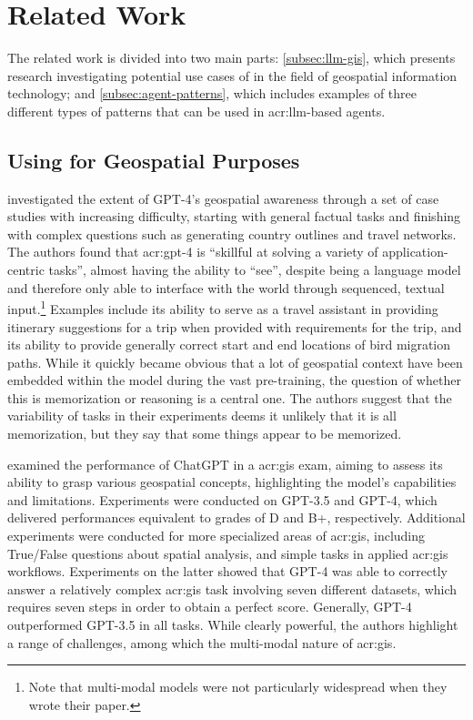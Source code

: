 \section{Related Work}
\label{sec:related-work}

The related work is divided into two main parts: \autoref{subsec:llm-gis}, which presents research investigating potential use cases of  in the field of geospatial information technology; and \autoref{subsec:agent-patterns}, which includes examples of three different types of patterns that can be used in \acrshort{acr:llm}-based agents.

\subsection[Using LLMs for Geospatial Purposes]{Using  for Geospatial Purposes}
\label{subsec:llm-gis}

\cite{robertsGPT4GEOHowLanguage2023} investigated the extent of GPT-4's geospatial awareness through a set of case studies with increasing difficulty, starting with general factual tasks and finishing with complex questions such as generating country outlines and travel networks. The authors found that \acrshort{acr:gpt}-4 is \enquote{skillful at solving a variety of application-centric tasks}, almost having the ability to \enquote{see}, despite being a language model and therefore only able to interface with the world through sequenced, textual input.\footnote{Note that multi-modal models were not particularly widespread when they wrote their paper.} Examples include its ability to serve as a travel assistant in providing itinerary suggestions for a trip when provided with requirements for the trip, and its ability to provide generally correct start and end locations of bird migration paths. While it quickly became obvious that a lot of geospatial context have been embedded within the model during the vast pre-training, the question of whether this is memorization or reasoning is a central one. The authors suggest that the variability of tasks in their experiments deems it unlikely that it is all memorization, but they say that some things appear to be memorized.

\cite{mooneyUnderstandingGeospatialSkills2023} examined the performance of ChatGPT in a \acrfull{acr:gis} exam, aiming to assess its ability to grasp various geospatial concepts, highlighting the model's capabilities and limitations. Experiments were conducted on GPT-3.5 and GPT-4, which delivered performances equivalent to grades of D and B+, respectively. Additional experiments were conducted for more specialized areas of \acrshort{acr:gis}, including True/False questions about spatial analysis, and simple tasks in applied \acrshort{acr:gis} workflows. Experiments on the latter showed that GPT-4 was able to correctly answer a relatively complex \acrshort{acr:gis} task involving seven different datasets, which requires seven steps in order to obtain a perfect score. Generally, GPT-4 outperformed GPT-3.5 in all tasks. While clearly powerful, the authors highlight a range of challenges, among which the multi-modal nature of \acrshort{acr:gis}.

